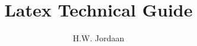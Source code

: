 \documentclass[]{article}
\title{Latex Technical Guide}
\author{H.W. Jordaan}
\begin{document}
\maketitle

\section{}
\end{document}
